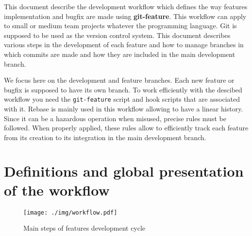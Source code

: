This document describe the development workflow which defines the way features implementation and bugfix are made using \textbf{git-feature}. This workflow can apply to small or medium team projects whatever the programming language. Git is supposed to be used as the version control system. This document describes various steps in the development of each feature and how to manage branches in which commits are made and how they are included in the main development branch.

We focus here on the development and feature branches. Each new feature or bugfix is supposed to have its own branch. To work efficiently with the descibed workflow you need the \texttt{git-feature} script and hook scripts that are associated with it. Rebase is mainly used in this workflow allowing to have a linear history. Since it can be a hazardous operation when misused, precise rules must be followed. When properly applied, these rules allow to efficiently track each feature from its creation to its integration in the main development branch.

\section{Definitions and global presentation of the workflow}

\begin{figure}[h]
 \centering
 \texttt{[image: ./img/workflow.pdf]}
 \caption{Main steps of features development cycle}
 \label{fig:workflow}
\end{figure}

